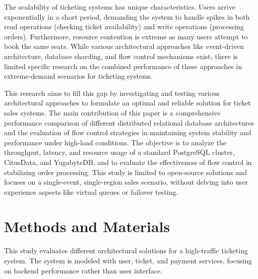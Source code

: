\documentclass{ieeeaccess}
\begin{document}
The scalability of ticketing systems has unique characteristics. Users arrive exponentially in a short period, demanding the system to handle spikes in both read operations (checking ticket availability) and write operations (processing orders). Furthermore, resource contention is extreme as many users attempt to book the same seats. While various architectural approaches like event-driven architecture, database sharding, and flow control mechanisms exist, there is limited specific research on the combined performance of these approaches in extreme-demand scenarios for ticketing systems.

This research aims to fill this gap by investigating and testing various architectural approaches to formulate an optimal and reliable solution for ticket sales systems. The main contribution of this paper is a comprehensive performance comparison of different distributed relational database architectures and the evaluation of flow control strategies in maintaining system stability and performance under high-load conditions. The objective is to analyze the throughput, latency, and resource usage of a standard PostgreSQL cluster, CitusData, and YugabyteDB, and to evaluate the effectiveness of flow control in stabilizing order processing. This study is limited to open-source solutions and focuses on a single-event, single-region sales scenario, without delving into user experience aspects like virtual queues or failover testing.

\section{Methods and Materials}
\label{sec:methods}
This study evaluates different architectural solutions for a high-traffic ticketing system. The system is modeled with user, ticket, and payment services, focusing on backend performance rather than user interface.
\end{document}
